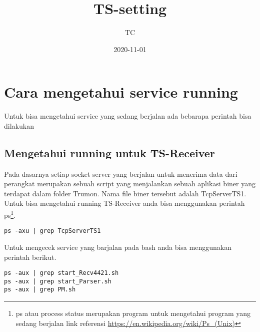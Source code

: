 \documentclass[11pt]{article}
\author{TC}
\date{2020-11-01}
\title{TS-setting}
\begin{document}
\maketitle
\tableofcontents


\section{Cara mengetahui service running}
\label{sec:org0721654}
Untuk bisa mengetahui service yang sedang berjalan ada bebarapa perintah
bisa dilakukan 
\subsection{Mengetahui running untuk TS-Receiver}
\label{sec:orgd4d92ee}
Pada dasarnya setiap socket server yang berjalan untuk menerima data dari
perangkat merupakan sebuah script yang menjalankan sebuah aplikasi biner 
yang terdapat dalam folder Trumon. Nama file biner tersebut adalah TcpServerTS1.
Untuk bisa mengetahui running TS-Receiver anda bisa menggunakan perintah ps\footnote{ps atau process status merupakan program untuk mengetahui program yang sedang berjalan
link referensi \url{https://en.wikipedia.org/wiki/Ps\_(Unix)}}.
\begin{verbatim}
ps -axu | grep TcpServerTS1
\end{verbatim}
Untuk mengecek service yang barjalan pada bash anda bisa menggunakan perintah 
berikut. 
\begin{verbatim}
ps -aux | grep start_Recv4421.sh
ps -aux | grep start_Parser.sh
ps -aux | grep PM.sh
\end{verbatim}
\end{document}
